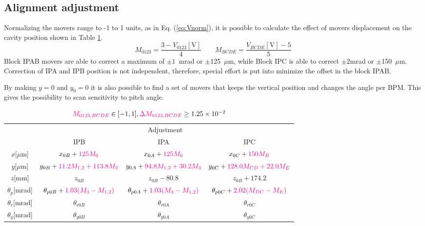\subsection{Alignment adjustment}\label{s:alignadj}
Normalizing the movers range to -1 to 1 units, as in Eq. (\ref{eq:Vnorm}), it is possible to calculate the effect of movers  displacement on the cavity position shown in Table \ref{t:aligncorr}.
\begin{equation}
 M_{0123}=\frac{3-V_{0123}[\text{V}]}{4} \qquad M_{BCDE}=\frac{V_{BCDE}[\text{V}]-5}{5}\label{eq:Vnorm}
\end{equation}
Block IPAB movers are able to correct a maximum of $\pm1$~mrad or $\pm$125~$\mu$m, while Block IPC is able to correct $\pm2$mrad or $\pm$150~$\mu$m. Correction of IPA and IPB position is not independent, therefore, special effort is put into minimize the offset in the block IPAB.\par
By making $y=0$ and $y_0=0$ it is also possible to find a set of movers that keeps the vertical position and changes the angle per BPM. This gives the possibility to scan sensitivity to pitch angle.\par
\begin{table}[h]
 \centering
 \begin{tabular}{c||c|c|c}\hline
 &\multicolumn{3}{c}{Adjustment}\\\cline{2-4}
 & IPB & IPA & IPC\\\hline\hline
$x$[$\mu$m] & $x_{0B}+{\color{magenta}125M_0}$ & $x_{0A}+{\color{magenta}125M_0}$&${x_{0C}+\color{magenta}150M_{B}}$\\
$y$[$\mu$m]& $y_{0B}+{\color{magenta}11.2M_{1,2}+113.8M_3}$&$y_{0A}+{\color{magenta}94.8M_{1,2}+30.2M_3}$&$y_{0C}+{\color{magenta}128.0M_{CD}+22.0M_E}$\\
$z$[mm]&$z_{0B}$&$z_{0B}-80.8$&$z_{0B}+174.2$\\
$\theta_{p}$[mrad]& $\theta_{p0B}+{\color{magenta}1.03(M_3-M_{1,2})}$ & $\theta_{p0A}+{\color{magenta}1.03(M_3-M_{1,2})}$ &$\theta_{p0C}+{\color{magenta} 2.02(M_{DC}-M_E)}$\\
$\theta_{r}$[mrad]&$\theta_{r0B}$&$\theta_{r0A}$&$\theta_{r0C}$\\
$\theta_{y}$[mrad]&$\theta_{y0B}$&$\theta_{y0A}$&$\theta_{y0C}$\\\hline
\end{tabular}\caption{${\color{magenta} M_{0123,BCDE}}\in[-1,1],{\color{magenta}\Delta M_{0123,BCDE}}\geq1.25\times 10^{-2}$}\label{t:aligncorr}
\end{table}


